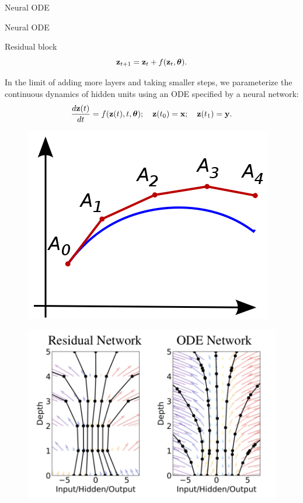\begin{frame}{Neural ODE}
\end{frame}
\begin{frame}{Neural ODE}
	\begin{block}{Residual block}
	\vspace{-0.4cm}
	\[
	    \mathbf{z}_{t+1} = \mathbf{z}_t + f(\mathbf{z}_t, \boldsymbol{\theta}).
	\]
	\vspace{-0.4cm}
	\end{block}
	In the limit of adding more layers and taking smaller steps, we parameterize the continuous dynamics of hidden units using an ODE specified by a neural network: 
	\[
	    \frac{d \mathbf{z}(t)}{dt} = f(\mathbf{z}(t), t, \boldsymbol{\theta}); \quad \mathbf{z}(t_0) = \mathbf{x}; \quad \mathbf{z}(t_1) = \mathbf{y}.
	\]
	\begin{minipage}[t]{0.4\columnwidth}
		\begin{figure}
			\centering
			\includegraphics[width=0.8\linewidth]{figs/euler}
		\end{figure}
	\end{minipage}%
	\begin{minipage}[t]{0.6\columnwidth}
		\vspace{-0.4cm}
		\begin{figure}
			\centering
			\includegraphics[width=0.9\linewidth]{figs/resnet_vs_neural_ode.png}
		\end{figure}
	\end{minipage}

\end{frame}


